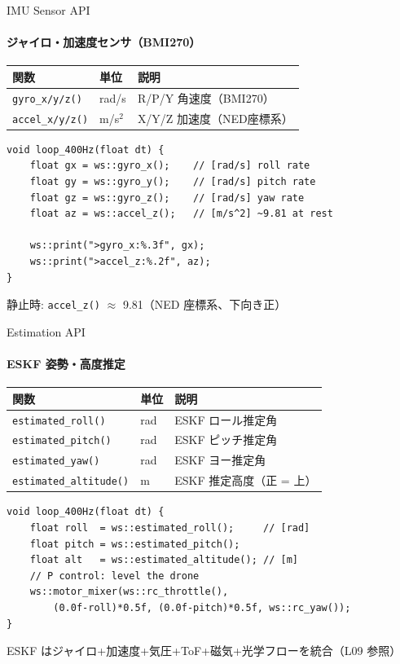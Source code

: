 \documentclass[aspectratio=169, 14pt]{beamer}
\begin{document}
\begin{frame}[fragile]{IMU Sensor API}
  \framesubtitle{ジャイロ・加速度センサ（BMI270）}
  {\small
  \begin{tabular}{lll}
    \hline
    \textbf{関数} & \textbf{単位} & \textbf{説明} \\
    \hline
    \texttt{gyro\_x/y/z()}  & rad/s   & R/P/Y 角速度（BMI270） \\
    \texttt{accel\_x/y/z()} & m/s$^2$ & X/Y/Z 加速度（NED座標系） \\
    \hline
  \end{tabular}
  }

  \vspace{0.3em}

  \begin{lstlisting}[style=sfcpp, basicstyle=\ttfamily\scriptsize]
void loop_400Hz(float dt) {
    float gx = ws::gyro_x();    // [rad/s] roll rate
    float gy = ws::gyro_y();    // [rad/s] pitch rate
    float gz = ws::gyro_z();    // [rad/s] yaw rate
    float az = ws::accel_z();   // [m/s^2] ~9.81 at rest

    ws::print(">gyro_x:%.3f", gx);
    ws::print(">accel_z:%.2f", az);
}
  \end{lstlisting}

  \vspace{0.2em}
  {\footnotesize 静止時: \texttt{accel\_z()} $\approx$ 9.81（NED 座標系、下向き正）}
\end{frame}

\begin{frame}[fragile]{Estimation API}
  \framesubtitle{ESKF 姿勢・高度推定}
  {\small
  \begin{tabular}{lll}
    \hline
    \textbf{関数} & \textbf{単位} & \textbf{説明} \\
    \hline
    \texttt{estimated\_roll()}     & rad & ESKF ロール推定角 \\
    \texttt{estimated\_pitch()}    & rad & ESKF ピッチ推定角 \\
    \texttt{estimated\_yaw()}      & rad & ESKF ヨー推定角 \\
    \texttt{estimated\_altitude()} & m   & ESKF 推定高度（正 = 上） \\
    \hline
  \end{tabular}
  }

  \vspace{0.3em}

  \begin{lstlisting}[style=sfcpp, basicstyle=\ttfamily\scriptsize]
void loop_400Hz(float dt) {
    float roll  = ws::estimated_roll();     // [rad]
    float pitch = ws::estimated_pitch();
    float alt   = ws::estimated_altitude(); // [m]
    // P control: level the drone
    ws::motor_mixer(ws::rc_throttle(),
        (0.0f-roll)*0.5f, (0.0f-pitch)*0.5f, ws::rc_yaw());
}
  \end{lstlisting}

  \vspace{0.2em}
  {\footnotesize ESKF はジャイロ+加速度+気圧+ToF+磁気+光学フローを統合（L09 参照）}
\end{frame}
\end{document}

